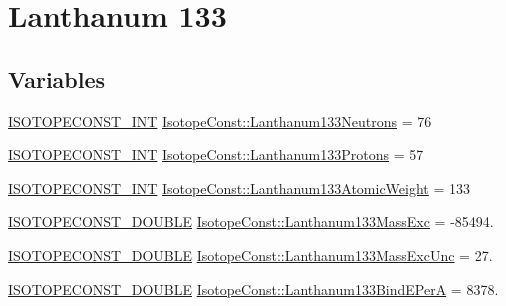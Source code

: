 \hypertarget{group___isotope_const-_lanthanum-_la133}{}\section{Lanthanum 133}
\label{group___isotope_const-_lanthanum-_la133}
\subsection*{Variables}
\begin{DoxyCompactItemize}
\item 
\mbox{\hyperlink{group___isotope_const-_macros_ga5f18360b3e99483a35c32d789e62621c}{I\+S\+O\+T\+O\+P\+E\+C\+O\+N\+S\+T\+\_\+\+I\+NT}} \mbox{\hyperlink{group___isotope_const-_lanthanum-_la133_ga9f442e7478f44e900f2dde6e0f5bf8f2}{Isotope\+Const\+::\+Lanthanum133\+Neutrons}} = 76
\item 
\mbox{\hyperlink{group___isotope_const-_macros_ga5f18360b3e99483a35c32d789e62621c}{I\+S\+O\+T\+O\+P\+E\+C\+O\+N\+S\+T\+\_\+\+I\+NT}} \mbox{\hyperlink{group___isotope_const-_lanthanum-_la133_ga51f6008bb477c6a93df0a9a28bbe5048}{Isotope\+Const\+::\+Lanthanum133\+Protons}} = 57
\item 
\mbox{\hyperlink{group___isotope_const-_macros_ga5f18360b3e99483a35c32d789e62621c}{I\+S\+O\+T\+O\+P\+E\+C\+O\+N\+S\+T\+\_\+\+I\+NT}} \mbox{\hyperlink{group___isotope_const-_lanthanum-_la133_ga5207aeebb047a9aedc4a2cad41315d3a}{Isotope\+Const\+::\+Lanthanum133\+Atomic\+Weight}} = 133
\item 
\mbox{\hyperlink{group___isotope_const-_macros_ga8f45a7272ce02c0b4c65c44636ed719a}{I\+S\+O\+T\+O\+P\+E\+C\+O\+N\+S\+T\+\_\+\+D\+O\+U\+B\+LE}} \mbox{\hyperlink{group___isotope_const-_lanthanum-_la133_gaf9873c4141bfacb54bbe61fae2e2a6bd}{Isotope\+Const\+::\+Lanthanum133\+Mass\+Exc}} = -\/85494.
\item 
\mbox{\hyperlink{group___isotope_const-_macros_ga8f45a7272ce02c0b4c65c44636ed719a}{I\+S\+O\+T\+O\+P\+E\+C\+O\+N\+S\+T\+\_\+\+D\+O\+U\+B\+LE}} \mbox{\hyperlink{group___isotope_const-_lanthanum-_la133_ga1207ca85d7c723156b72abae86908780}{Isotope\+Const\+::\+Lanthanum133\+Mass\+Exc\+Unc}} = 27.
\item 
\mbox{\hyperlink{group___isotope_const-_macros_ga8f45a7272ce02c0b4c65c44636ed719a}{I\+S\+O\+T\+O\+P\+E\+C\+O\+N\+S\+T\+\_\+\+D\+O\+U\+B\+LE}} \mbox{\hyperlink{group___isotope_const-_lanthanum-_la133_ga3ae8767b6177a56f078e03b646b40f1e}{Isotope\+Const\+::\+Lanthanum133\+Bind\+E\+PerA}} = 8378.
\item 

\end{DoxyCompactItemize}
